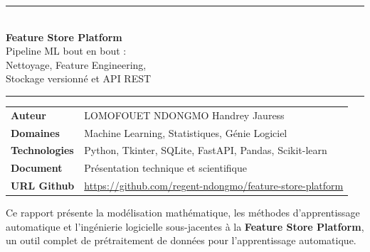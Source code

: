 \documentclass[12pt,a4paper]{article}
\begin{document}
\begin{titlepage}

\vspace*{2.5cm}

\vspace{3cm}
\begin{center}
  {\color{TitleColor}\rule{0.85\textwidth}{1.5pt}}\\[0.6cm]
  {\color{TitleColor}\Huge\bfseries Feature Store Platform}\\[0.4cm]
  {\color{AccentBlue}\LARGE Pipeline ML bout en bout :}\\[0.2cm]
  {\color{AccentBlue}\large Nettoyage, Feature Engineering,}\\[0.1cm]
  {\color{AccentBlue}\large Stockage versionné et API REST}\\[0.6cm]
  {\color{TitleColor}\rule{0.85\textwidth}{1.5pt}}
\end{center}

\vspace{1.5cm}
\begin{center}
  \begin{tabular}{ll}
    \textbf{Auteur}       & LOMOFOUET NDONGMO Handrey Jauress \\[4pt]
    \textbf{Domaines}     & Machine Learning, Statistiques, Génie Logiciel \\[4pt]
    \textbf{Technologies} & Python, Tkinter, SQLite, FastAPI, Pandas, Scikit-learn \\[4pt]
    \textbf{Document}     & Présentation technique et scientifique \\
    \textbf{URL Github} & \url{https://github.com/regent-ndongmo/feature-store-platform}} \\
  \end{tabular}
\end{center}

\vfill
\begin{center}
  {\color{white}\small Ce rapport présente la modélisation mathématique, les méthodes
  d'apprentissage automatique et l'ingénierie logicielle sous-jacentes à la
  \textbf{Feature Store Platform}, un outil complet de prétraitement de données pour
  l'apprentissage automatique.}
\end{center}
\vspace*{0.5cm}
\end{titlepage}
\end{document}
